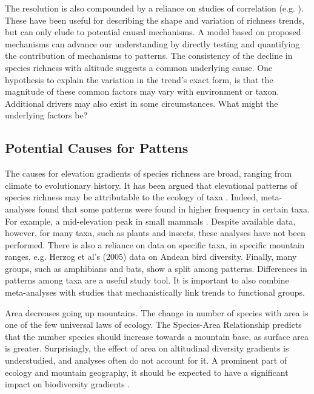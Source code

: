 \documentclass[11pt]{article}
\begin{document}
The resolution is also compounded by a reliance on studies of correlation (e.g. \cite{mccain2007could, o1993climatic}). These have been useful for describing the shape and variation of richness trends, but can only elude to potential causal mechanisms. A model based on proposed mechanisms can advance our understanding by directly testing and quantifying the contribution of mechanisms to patterns. The consistency of the decline in species richness with altitude suggests a common underlying cause. One hypothesis to explain the variation in the trend’s exact form, is that the magnitude of these common factors may vary with environment or taxon. Additional drivers may also exist in some circumstances. What might the underlying factors be?

\subsection*{Potential Causes for Pattens}
The causes for elevation gradients of species richness are broad, ranging from climate to evolutionary history. It has been argued that elevational patterns of species richness may be attributable to the ecology of taxa \cite{McCain2010a}. Indeed, meta-analyses found that some patterns were found in higher frequency in certain taxa. For example, a mid-elevation peak in small mammals \cite{mccain2005elevational}. Despite available data, however, for many taxa, such as plants and insects, these analyses have not been performed. There is also a reliance on data on specific taxa, in specific mountain ranges, e.g. Herzog et al’s (2005) data on Andean bird diversity. Finally, many groups, such as amphibians and bats, show a split among patterns. Differences in patterns among taxa are a useful study tool. It is important to also combine meta-analyses with studies that mechanistically link trends to functional groups.

Area decreases going up mountains. The change in number of species with area is one of the few universal laws of ecology. The Species-Area Relationship predicts that the number species should increase towards a mountain base, as surface area is greater. Surprisingly, the effect of area on altitudinal diversity gradients is understudied, and analyses often do not account for it. A prominent part of ecology and mountain geography, it should be expected to have a significant impact on biodiversity gradients \cite{rahbek1997relationship, rosenzweig1995species, gaston2008pattern}.
\end{document}
